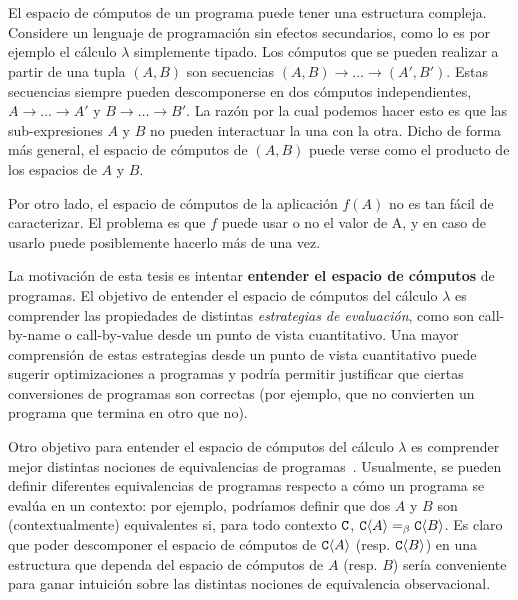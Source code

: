 \section*{}

El espacio de cómputos de un programa puede tener una estructura compleja.
Considere un lenguaje de programación sin efectos secundarios,
como lo es por ejemplo el cálculo $\lambda$ simplemente tipado.
Los cómputos que se pueden realizar a partir de una tupla $(A,B)$
son secuencias $(A, B) \to \hdots \to (A', B')$.
Estas secuencias siempre pueden descomponerse
en dos cómputos independientes,
$A \to \hdots \to A'$ y $B \to \hdots \to B'$.
La razón por la cual podemos hacer esto es que las sub-expresiones $A$ y $B$
no pueden interactuar la una con la otra.
Dicho de forma más general, el espacio de cómputos de $(A,B)$ puede
verse como el producto de los espacios de $A$ y $B$.

Por otro lado, el espacio de cómputos de la aplicación $f(A)$
no es tan fácil de caracterizar.
El problema es que $f$ puede usar o no el valor de A,
y en caso de usarlo puede posiblemente hacerlo más de una vez.


La motivación de esta tesis es intentar \textbf{entender el espacio de cómputos} de programas.
El objetivo de entender el espacio de cómputos del cálculo $\lambda$ es comprender
las propiedades de distintas \textit{estrategias de evaluación},
como son call-by-name o call-by-value desde un punto de vista cuantitativo.
Una mayor comprensión de estas estrategias desde un punto de vista cuantitativo puede
sugerir optimizaciones a programas y podría permitir justificar que
ciertas conversiones de programas son correctas (por ejemplo, que no
convierten un programa que termina en otro que no).

Otro objetivo para entender el espacio de cómputos del cálculo $\lambda$ es comprender mejor
distintas nociones de equivalencias de programas~\cite{Tesis:Morris,Bre16}.
Usualmente, se pueden definir diferentes equivalencias de
programas respecto a cómo un programa se evalúa en un contexto:
por ejemplo,
podríamos definir que dos $A$ y $B$ son (contextualmente) equivalentes
si, para todo contexto $\mathtt{C}$, $\mathtt{C}\langle A\rangle =_{\beta} \mathtt{C}\langle B\rangle$.
Es claro que poder descomponer el espacio de cómputos de $\mathtt{C}\langle A\rangle$ (resp. $\mathtt{C}\langle B\rangle$) en una
estructura que dependa del espacio de cómputos de $A$ (resp. $B$) sería conveniente
para ganar intuición sobre las distintas nociones de equivalencia observacional.

\vspace{1cm}

